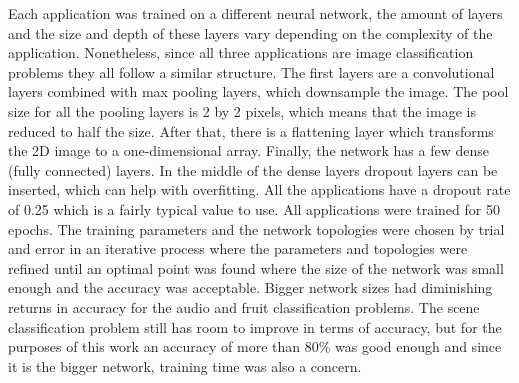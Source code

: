 Each application was trained on a different neural network, the amount of layers and the size and depth of these layers vary depending on the complexity of the application. Nonetheless, since all three applications are image classification problems they all follow a similar structure. The first layers are a convolutional layers combined with max pooling layers, which downsample the image. The pool size for all the pooling layers is 2 by 2 pixels, which means that the image is reduced to half the size. After that, there is a flattening layer which transforms the 2D image to a one-dimensional array. Finally, the network has a few dense (fully connected) layers. In the middle of the dense layers dropout layers can be inserted, which can help with overfitting. All the applications have a dropout rate of 0.25 which is a fairly typical value to use. All applications were trained for 50 epochs. The training parameters and the network topologies were chosen by trial and error in an iterative process where the parameters and topologies were refined until an optimal point was found where the size of the network was small enough and the accuracy was acceptable. Bigger network sizes had diminishing returns in accuracy for the audio and fruit classification problems. The scene classification problem still has room to improve in terms of accuracy, but for the purposes of this work an accuracy of more than 80\% was good enough and since it is the bigger network, training time was also a concern.

